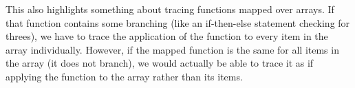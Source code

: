         This also highlights something about tracing functions mapped over arrays.
        If that function contains some branching (like an if-then-else statement checking for threes), we have to trace the application of the function to every item in the array individually.
        However, if the mapped function is the same for all items in the array (it does not branch), we would actually be able to trace it as if applying the function to the array rather than its items.

